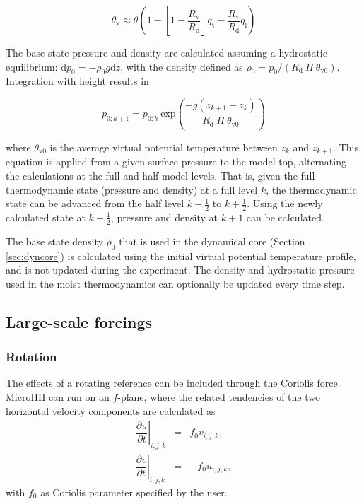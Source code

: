 \documentclass[gmd]{copernicus}
\begin{document}
\begin{equation}
	\theta_\mathrm{v} \approx \theta \left(1-\left[1-\frac{R_\mathrm{v}}{R_\mathrm{d}}\right] q_\mathrm{t} - \frac{R_\mathrm{v}}{R_\mathrm{d}} q_\mathrm{l} \right)
\end{equation}

The base state pressure and density are calculated assuming a hydrostatic equilibrium: $\mathrm{d}p_0 = -\rho_0 g \mathrm{d}z$, with the density defined as $\rho_0 = p_0 / (R_\mathrm{d} ~ \Pi ~ \theta_\mathrm{v0})$. Integration with height results in

\begin{equation}
	p_{0;k+1} = p_{0;k} ~ \mathrm{exp}\left(\frac{-g (z_{k+1}-z_k)}{R_\mathrm{d} ~ \Pi ~ \theta_\mathrm{v0}} \right )
\end{equation}

\noindent where $\theta_\mathrm{v0}$ is the average virtual potential temperature between $z_k$ and $z_{k+1}$. This equation is applied from a given surface pressure to the model top, alternating the calculations at the full and half model levels. That is, given the full thermodynamic state (pressure and density) at a full level $k$, the thermodynamic state can be advanced from the half level $k-\frac{1}{2}$ to $k+\frac{1}{2}$. Using the newly calculated state at $k+\frac{1}{2}$, pressure and density at $k+1$ can be calculated. 

The base state density $\rho_0$ that is used in the dynamical core (Section \ref{sec:dyncore}) is calculated using the initial virtual potential temperature profile, and is not updated during the experiment. The density and hydrostatic pressure used in the moist thermodynamics can optionally be updated every time step.

\subsection{Large-scale forcings}
\subsubsection{Rotation}
The effects of a rotating reference can be included through the Coriolis force. MicroHH can run on an $f$-plane, where the related tendencies of the two horizontal velocity components are calculated as
\begin{eqnarray}
\left. \dfrac{\partial u}{\partial t}\right|_{i,j,k} & = & f_0 v_{i,j,k},\\
\left. \dfrac{\partial v}{\partial t}\right|_{i,j,k} & = & -f_0 u_{i,j,k},
\end{eqnarray}
with $f_0$ as Coriolis parameter specified by the user.
\end{document}
